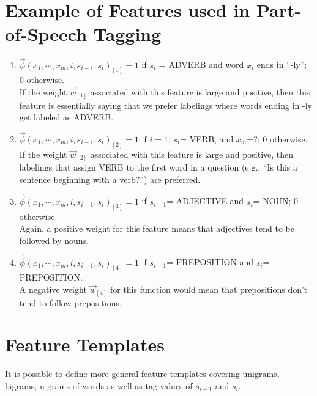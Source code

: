 \section{Example of Features used in Part-of-Speech Tagging}

\begin{enumerate}
 \item $\vec{\phi}(x_1, \cdots, x_m, i, s_{i-1},s_i)_{[1]}=1$ if $s_i$ = ADVERB and word $x_i$ ends in ``-ly''; 0 otherwise. \\ 
 
 If the weight $\vec{w}_{[1]}$ associated with this feature is large and positive, then this feature is essentially saying that we prefer labelings where words ending in -ly get labeled as ADVERB.
 
 \item $\vec{\phi}(x_1, \cdots, x_m, i, s_{i-1},s_i)_{[2]}=1$ if $i=1$, $s_i$= VERB, and $x_m$=?; 0 otherwise. 
 \\ If the weight $\vec{w}_{[2]}$ associated with this feature is large and positive, then labelings that assign VERB to the first word in a question (e.g., ``Is this a sentence beginning with a verb?'') are preferred.


\item $\vec{\phi}(x_1, \cdots, x_m, i, s_{i-1},s_i)_{[3]}=1$ if $s_{i-1}$= ADJECTIVE and $s_i$= NOUN; 0 otherwise. 
\\Again, a positive weight for this feature means that adjectives tend to be followed by nouns. 

\item $\vec{\phi}(x_1, \cdots, x_m, i, s_{i-1},s_i)_{[4]}=1$ if $s_{i-1}$= PREPOSITION and $s_{i}$= PREPOSITION. 
\\ A negative weight $\vec{w}_{[4]}$ for this function would mean that prepositions don't tend to follow prepositions.

 
\end{enumerate}





\section{Feature Templates}

It is possible to define more general feature templates covering unigrams, bigrams, n-grams of words as well as tag values of $s_{i-1}$ and $s_i$.

